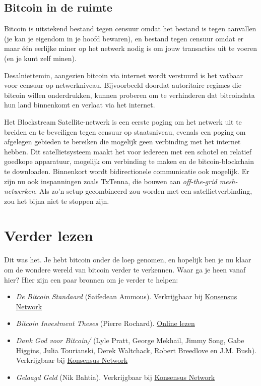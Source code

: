 \documentclass[
  letterpaper,
]{scrbook}
\begin{document}
\hypertarget{bitcoin-in-de-ruimte}{%
\section{Bitcoin in de ruimte}\label{bitcoin-in-de-ruimte}}

Bitcoin is uitstekend bestand tegen censuur omdat het bestand is tegen
aanvallen (je kan je eigendom in je hoofd bewaren), en bestand tegen
censuur omdat er maar één eerlijke miner op het netwerk nodig is om jouw
transacties uit te voeren (en je kunt zelf minen).

Desalniettemin, aangezien bitcoin via internet wordt verstuurd is het
vatbaar voor censuur op netwerkniveau. Bijvoorbeeld doordat autoritaire
regimes die bitcoin willen onderdrukken, kunnen proberen om te
verhinderen dat bitcoindata hun land binnenkomt en verlaat via het
internet.

Het Blockstream Satellite-netwerk is een eerste poging om het netwerk
uit te breiden en te beveiligen tegen censuur op staatsniveau, evenals
een poging om afgelegen gebieden te bereiken die mogelijk geen
verbinding met het internet hebben. Dit satellietsysteem maakt het voor
iedereen met een schotel en relatief goedkope apparatuur, mogelijk om
verbinding te maken en de bitcoin-blockchain te downloaden. Binnenkort
wordt bidirectionele communicatie ook mogelijk. Er zijn nu ook
inspanningen zoals TxTenna, die bouwen aan \emph{off-the-grid
mesh-netwerken}. Als zo'n setup gecombineerd zou worden met een
satellietverbinding, zou het bijna niet te stoppen zijn.


\hypertarget{verder-lezen}{%
\chapter*{Verder lezen}\label{verder-lezen}}


Dit was het. Je hebt bitcoin onder de loep genomen, en hopelijk ben je
nu klaar om de wondere wereld van bitcoin verder te verkennen. Waar ga
je heen vanaf hier? Hier zijn een paar bronnen om je verder te helpen:

\begin{itemize}
\item
  \emph{De Bitcoin Standaard} (Saifedean Ammous). Verkrijgbaar bij
  \href{https://konsensus.network/product/de-bitcoin-standaard}{Konsensus
  Network}
\item
  \emph{Bitcoin Investment Theses} (Pierre Rochard).
  \href{https://pierre-rochard.medium.com/bitcoin-investment-theses-part-1-e97670b5389b}{Online
  lezen}
\item
  \emph{Dank God voor Bitcoin/} (Lyle Pratt, George Mekhail, Jimmy Song,
  Gabe Higgins, Julia Tourianski, Derek Waltchack, Robert Breedlove en
  J.M. Bush). Verkrijgbaar bij
  \href{https://konsensus.network/product/dank-god-voor-bitcoin/}{Konsensus
  Network}
\item
  \emph{Gelaagd Geld} (Nik Bahtia). Verkrijgbaar bij
  \href{https://konsensus.network/product/gelaagd-geld/}{Konsensus
  Network}
\end{itemize}
\end{document}
